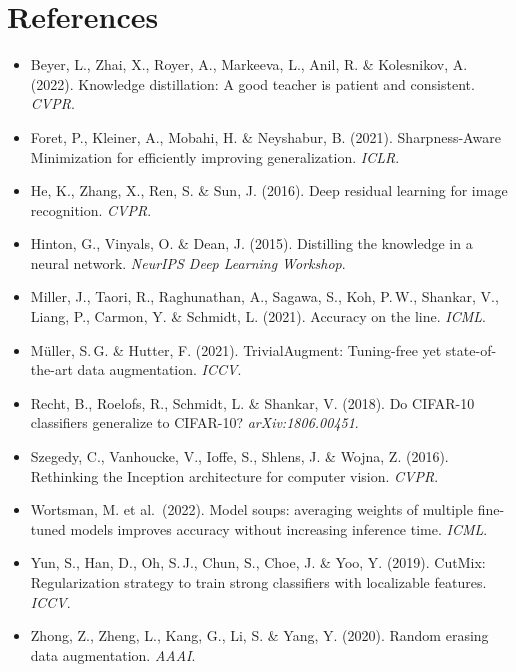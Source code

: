 \documentclass[11pt]{article}
\begin{document}
\section*{References}
\footnotesize
\begin{itemize}[leftmargin=1em,label={}]
\item Beyer, L., Zhai, X., Royer, A., Markeeva, L., Anil, R. \& Kolesnikov, A. (2022). Knowledge distillation: A good teacher is patient and consistent. \emph{CVPR}.
\item Foret, P., Kleiner, A., Mobahi, H. \& Neyshabur, B. (2021). Sharpness-Aware Minimization for efficiently improving generalization. \emph{ICLR}.
\item He, K., Zhang, X., Ren, S. \& Sun, J. (2016). Deep residual learning for image recognition. \emph{CVPR}.
\item Hinton, G., Vinyals, O. \& Dean, J. (2015). Distilling the knowledge in a neural network. \emph{NeurIPS Deep Learning Workshop}.
\item Miller, J., Taori, R., Raghunathan, A., Sagawa, S., Koh, P.\,W., Shankar, V., Liang, P., Carmon, Y. \& Schmidt, L. (2021). Accuracy on the line. \emph{ICML}.
\item M\"uller, S.\,G. \& Hutter, F. (2021). TrivialAugment: Tuning-free yet state-of-the-art data augmentation. \emph{ICCV}.
\item Recht, B., Roelofs, R., Schmidt, L. \& Shankar, V. (2018). Do CIFAR-10 classifiers generalize to CIFAR-10? \emph{arXiv:1806.00451}.
\item Szegedy, C., Vanhoucke, V., Ioffe, S., Shlens, J. \& Wojna, Z. (2016). Rethinking the Inception architecture for computer vision. \emph{CVPR}.
\item Wortsman, M. et al.\ (2022). Model soups: averaging weights of multiple fine-tuned models improves accuracy without increasing inference time. \emph{ICML}.
\item Yun, S., Han, D., Oh, S.\,J., Chun, S., Choe, J. \& Yoo, Y. (2019). CutMix: Regularization strategy to train strong classifiers with localizable features. \emph{ICCV}.
\item Zhong, Z., Zheng, L., Kang, G., Li, S. \& Yang, Y. (2020). Random erasing data augmentation. \emph{AAAI}.
\end{itemize}
\end{document}
